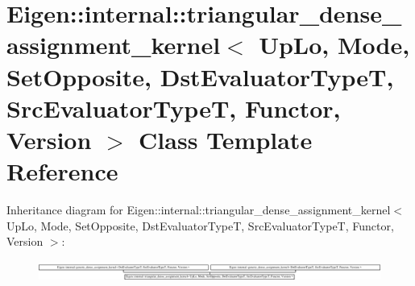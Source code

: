 \hypertarget{class_eigen_1_1internal_1_1triangular__dense__assignment__kernel}{}\section{Eigen\+:\+:internal\+:\+:triangular\+\_\+dense\+\_\+assignment\+\_\+kernel$<$ Up\+Lo, Mode, Set\+Opposite, Dst\+Evaluator\+TypeT, Src\+Evaluator\+TypeT, Functor, Version $>$ Class Template Reference}
\label{class_eigen_1_1internal_1_1triangular__dense__assignment__kernel}
Inheritance diagram for Eigen\+:\+:internal\+:\+:triangular\+\_\+dense\+\_\+assignment\+\_\+kernel$<$ Up\+Lo, Mode, Set\+Opposite, Dst\+Evaluator\+TypeT, Src\+Evaluator\+TypeT, Functor, Version $>$\+:\begin{figure}[H]
\begin{center}
\leavevmode
\includegraphics[height=0.680437cm]{class_eigen_1_1internal_1_1triangular__dense__assignment__kernel}
\end{center}
\end{figure}
